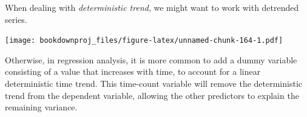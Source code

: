 \documentclass[
]{article}
\newenvironment{Shaded}{\begin{snugshade}}{\end{snugshade}}
\newcommand{\CommentTok}[1]{\textcolor[rgb]{0.56,0.35,0.01}{\textit{#1}}}
\newcommand{\DataTypeTok}[1]{\textcolor[rgb]{0.13,0.29,0.53}{#1}}
\newcommand{\DecValTok}[1]{\textcolor[rgb]{0.00,0.00,0.81}{#1}}
\newcommand{\KeywordTok}[1]{\textcolor[rgb]{0.13,0.29,0.53}{\textbf{#1}}}
\newcommand{\NormalTok}[1]{#1}
\newcommand{\OperatorTok}[1]{\textcolor[rgb]{0.81,0.36,0.00}{\textbf{#1}}}
\newcommand{\StringTok}[1]{\textcolor[rgb]{0.31,0.60,0.02}{#1}}
\begin{document}
When dealing with \emph{deterministic trend}, we might want to work with detrended series.

\begin{Shaded}
\end{Shaded}

\texttt{[image: bookdownproj\_files/figure-latex/unnamed-chunk-164-1.pdf]}

Otherwise, in regression analysis, it is more common to add a dummy variable consisting of a value that increases with time, to account for a linear deterministic time trend. This time-count variable will remove the deterministic trend from the dependent variable, allowing the other predictors to explain the remaining variance.
\end{document}
